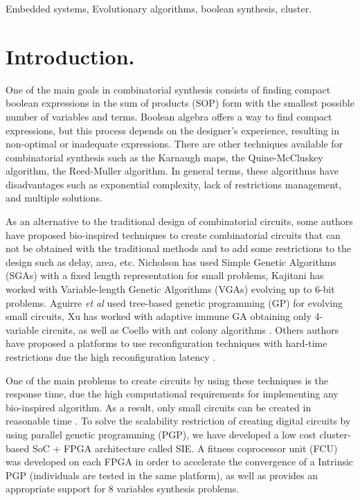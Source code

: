\documentclass{sig-alternate}
\begin{document}
\begin{keywords}
Embedded systems, Evolutionary algorithms, boolean synthesis, cluster.
\end{keywords}
\section{Introduction.}

One of the main goals in combinatorial synthesis consists of finding compact boolean expressions in the sum of products (SOP) form with the smallest possible number of variables and terms. Boolean algebra offers a way to find compact expressions, but this process depends on the designer's experience, resulting in non-optimal or inadequate expressions. There are other techniques available for combinatorial synthesis such as the Karnaugh maps, the Quine-McCluskey algorithm, the Reed-Muller algorithm. In general terms, these algorithms have disadvantages such as exponential complexity, lack of restrictions management, and multiple solutions. 

As an alternative to the traditional design of combinatorial circuits, some authors have proposed bio-inspired techniques to create combinatorial circuits that can not be obtained with the traditional methods and to add some restrictions to the design such as delay, area, etc. Nicholson \cite{Nicholson} has used Simple Genetic Algorithms (SGAs) with a fixed length representation for small problems, Kajitani \cite{Kajitani:1996p16} has worked with Variable-length Genetic Algorithms (VGAs) evolving up to 6-bit problems. Aguirre \textit{et al} \cite{Aguirre:2009p66} used tree-based genetic programming (GP) for evolving small circuits, Xu \cite{Xu2009} has worked with adaptive immune GA obtaining only 4-variable circuits, as well as Coello with ant colony algorithms \cite{coello2000}. Others authors have proposed a platforms to use reconfiguration techniques with hard-time restrictions due the high reconfiguration latency \cite{UpeguiS06,MorenoTS05,UpeguiS05}. 

One of the main problems to create circuits by using these techniques is the response time, due the high computational requirements for implementing any bio-inspired algorithm. As a result, only small circuits can be created in reasonable time \cite{Vasicek2008, koza2005}.
To solve the scalability restriction of creating digital circuits by using parallel genetic programming (PGP), we have developed a low cost cluster-based SoC + FPGA  architecture called SIE. A fitness coprocessor unit (FCU) was developed on each FPGA in order to accelerate the convergence of a Intrinsic PGP (individuals are tested in the same platform), as well as provides an appropriate support for 8 variables synthesis problems. 
\end{document}
